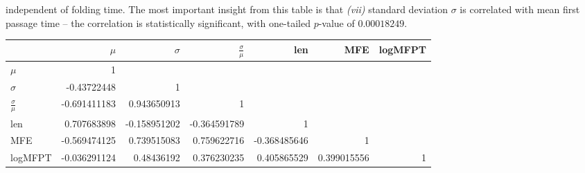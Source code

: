 \begin{table}[!ht]
{independent of folding time.
The most important insight from this table is that
{\em (vii)}
standard deviation $\sigma$ is correlated with mean first passage
time -- the correlation is statistically significant, with one-tailed
$p$-value of $0.00018249$.}
\begin{center}
\begin{tabular}{|l|rrrrrr|}
\hline
~ &$\mu$ &$\sigma$& $\frac{\sigma}{\mu}$&len& MFE & logMFPT\\
\hline
$\mu$& 1 & & & & &\\
$\sigma$&-0.43722448& 1  & & & & \\
$\frac{\sigma}{\mu}$&-0.691411183&0.943650913&1 & & &\\
len&0.707683898&-0.158951202&-0.364591789&1& & \\
MFE&-0.569474125&0.739515083&0.759622716&-0.368485646&1 & \\
logMFPT&-0.036291124&0.48436192&0.376230235&0.405865529&0.399015556& 1 \\
\hline
\end{tabular}
\label{table:correlationFFTborEmpty}
\end{center}
\end{table}



